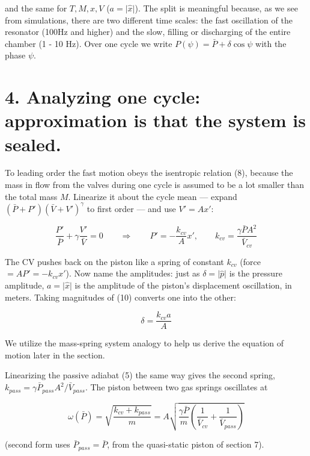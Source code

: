 \documentclass[11pt]{article}
\begin{document}
and the same for $T, M, x, V$ ($a = \lvert\hat x\rvert$). The split is meaningful because, as we see from simulations, there are two different time scales: the fast oscillation of the resonator (100Hz and higher) and the slow, filling or discharging of the entire chamber (1 - 10 Hz). Over one cycle we write $P(\psi) = \bar P + \delta\cos\psi$ with the phase $\psi$.

\section*{4. Analyzing one cycle: approximation is that the system is sealed.}

To leading order the fast motion obeys the isentropic relation (8), because the mass in flow from the valves during one cycle is assumed to be a lot smaller than the total mass $M$. Linearize it about the cycle mean --- expand $(\bar P + P')(\bar V + V')^\gamma$ to first order --- and use $V' = Ax'$:

\begin{equation}
\frac{P'}{\bar P} + \gamma\frac{V'}{\bar V} = 0 \qquad\Longrightarrow\qquad P' = -\frac{k_{cv}}{A}x', \qquad k_{cv} = \frac{\gamma\bar PA^2}{\bar V_{cv}} \tag{10}
\end{equation}

The CV pushes back on the piston like a spring of constant $k_{cv}$ (force $= AP' = -k_{cv}x'$). Now name the amplitudes: just as $\delta = \lvert\hat p\rvert$ is the pressure amplitude, $a = \lvert\hat x\rvert$ is the amplitude of the piston's displacement oscillation, in meters. Taking magnitudes of (10) converts one into the other:

\begin{equation}
\delta = \frac{k_{cv}a}{A} \tag{11}
\end{equation}

We utilize the mass-spring system analogy to help us derive the equation of motion later in the section.

Linearizing the passive adiabat (5) the same way gives the second spring, $k_{pass} = \gamma\bar P_{pass}A^2/\bar V_{pass}$. The piston between two gas springs oscillates at

\begin{equation}
\omega(\bar P) = \sqrt{\frac{k_{cv}+k_{pass}}{m}} = A\sqrt{\frac{\gamma\bar P}{m}\left(\frac{1}{\bar V_{cv}} + \frac{1}{\bar V_{pass}}\right)} \tag{12}
\end{equation}

(second form uses $\bar P_{pass} = \bar P$, from the quasi-static piston of section 7).
\end{document}
